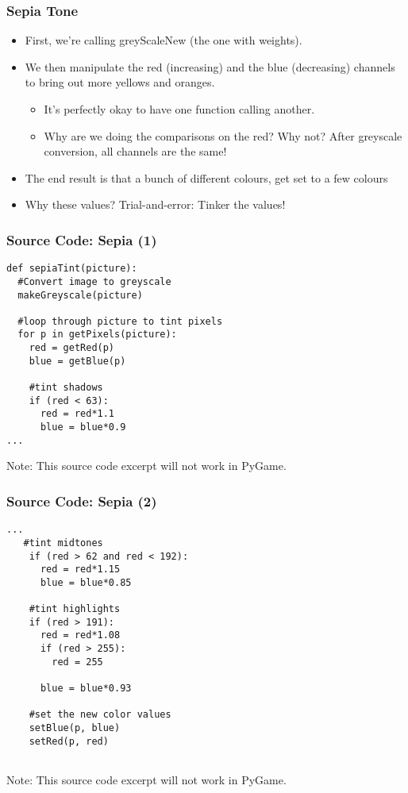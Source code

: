 

\begin{frame}
	\frametitle{Sepia Tone}
	
	\begin{itemize}		
		\item First, we're calling greyScaleNew (the one with weights).
		\item We then manipulate the red (increasing) and the blue (decreasing) channels to bring out more yellows and oranges.
		\begin{itemize}
			\item It's perfectly okay to have one function calling another.
			\item Why are we doing the comparisons on the red? Why not?  After greyscale conversion, all channels are the same!
		\end{itemize}	
		\item The end result is that a bunch of different colours, get set to a few colours
		\item Why these values? Trial-and-error: Tinker the values!

	\end{itemize}
\end{frame}

\begin{frame}[fragile]
	\frametitle{Source Code: Sepia (1)}
	
\begin{lstlisting}
def sepiaTint(picture):
  #Convert image to greyscale
  makeGreyscale(picture)

  #loop through picture to tint pixels
  for p in getPixels(picture):
    red = getRed(p)
    blue = getBlue(p)

    #tint shadows
    if (red < 63):
      red = red*1.1
      blue = blue*0.9
...
\end{lstlisting}

Note: This source code excerpt will not work in PyGame.

\end{frame}

\begin{frame}[fragile]
	\frametitle{Source Code: Sepia (2)}
	
\begin{lstlisting}
...
   #tint midtones
    if (red > 62 and red < 192):
      red = red*1.15
      blue = blue*0.85

    #tint highlights
    if (red > 191):
      red = red*1.08
      if (red > 255):
        red = 255

      blue = blue*0.93

    #set the new color values
    setBlue(p, blue)
    setRed(p, red)


\end{lstlisting}

Note: This source code excerpt will not work in PyGame.

\end{frame}

